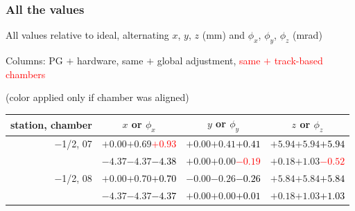 \documentclass[compress]{beamer}
\begin{document}
\begin{frame}
\frametitle{All the values}
\tiny

All values relative to ideal, alternating $x$, $y$, $z$ (mm) and $\phi_x$, $\phi_y$, $\phi_z$ (mrad)

Columns: PG $+$ hardware, same $+$ global adjustment, \textcolor{red}{same $+$ track-based chambers}

\hfill (color applied only if chamber was aligned)

\vfill
\renewcommand{\arraystretch}{1.1}
\begin{tabular}{r | c | c | c}
station, chamber & $x$ or $\phi_x$ & $y$ or $\phi_y$ & $z$ or $\phi_z$ \\\hline
$-$1/2, 07 & $+0.00$\hspace{0.1 cm}$+0.69$\hspace{0.1 cm}\textcolor{red}{$+0.93$} & $+0.00$\hspace{0.1 cm}$+0.41$\hspace{0.1 cm}\textcolor{black}{$+0.41$} & $+5.94$\hspace{0.1 cm}$+5.94$\hspace{0.1 cm}\textcolor{black}{$+5.94$} \\
           & $-4.37$\hspace{0.1 cm}$-4.37$\hspace{0.1 cm}\textcolor{black}{$-4.38$} & $+0.00$\hspace{0.1 cm}$+0.00$\hspace{0.1 cm}\textcolor{red}{$-0.19$} & $+0.18$\hspace{0.1 cm}$+1.03$\hspace{0.1 cm}\textcolor{red}{$-0.52$} \\
$-$1/2, 08 & $+0.00$\hspace{0.1 cm}$+0.70$\hspace{0.1 cm}\textcolor{black}{$+0.70$} & $-0.00$\hspace{0.1 cm}$-0.26$\hspace{0.1 cm}\textcolor{black}{$-0.26$} & $+5.84$\hspace{0.1 cm}$+5.84$\hspace{0.1 cm}\textcolor{black}{$+5.84$} \\
           & $-4.37$\hspace{0.1 cm}$-4.37$\hspace{0.1 cm}\textcolor{black}{$-4.37$} & $+0.00$\hspace{0.1 cm}$+0.00$\hspace{0.1 cm}\textcolor{black}{$+0.01$} & $+0.18$\hspace{0.1 cm}$+1.03$\hspace{0.1 cm}\textcolor{black}{$+1.03$} \\

\end{tabular}
\end{frame}
\end{document}
